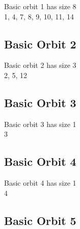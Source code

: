

Basic orbit 1 has size 8\\
1, 4, 7, 8, 9, 10, 11, 14\\
\bigskip

\subsection*{Basic Orbit 2}



Basic orbit 2 has size 3\\
2, 5, 12\\
\bigskip

\subsection*{Basic Orbit 3}



Basic orbit 3 has size 1\\
3\\
\bigskip

\subsection*{Basic Orbit 4}



Basic orbit 4 has size 1\\
4\\
\bigskip

\subsection*{Basic Orbit 5}



